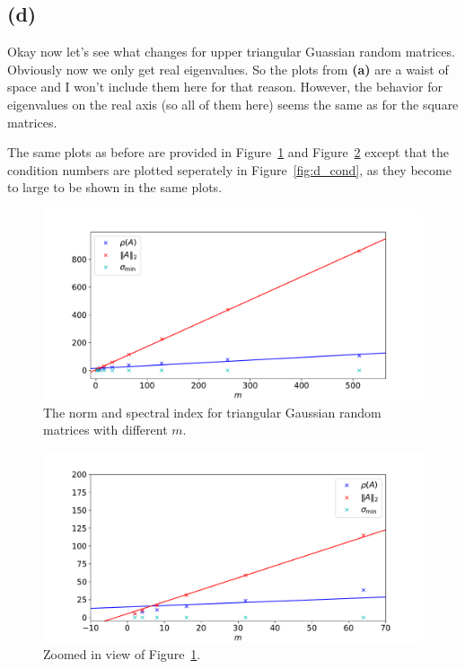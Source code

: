 \documentclass[a4paper, 11pt]{article}
\begin{document}
\FloatBarrier
\subsection*{(d)}
Okay now let's see what changes for upper triangular Guassian random matrices.
Obviously now we only get real eigenvalues. So the plots from \textbf{(a)} are
a waist of space and I won't include them here for that reason. However, the
behavior for eigenvalues on the real axis (so all of them here) seems the same
as for the square matrices.

The same plots as before are provided in Figure~\ref{fig:d_a-c} and
Figure~\ref{fig:d_a-c_zoomed} except that the condition numbers are plotted
seperately in Figure~\ref{fig:d_cond}, as they become to large to be shown in
the same plots. 
\begin{figure}
  \centering
  \includegraphics[width=\textwidth]{../2/triangular/norm_spectral.pdf}
  \caption{The norm and spectral index for triangular Gaussian random matrices
  with different $m$.}
  \label{fig:d_a-c}
\end{figure}
\begin{figure}
  \centering
  \includegraphics[width=\textwidth]{../2/triangular/norm_spectral_zoomed.pdf}
  \caption{Zoomed in view of Figure~\ref{fig:d_a-c}.}
  \label{fig:d_a-c_zoomed}
\end{figure}
\end{document}
